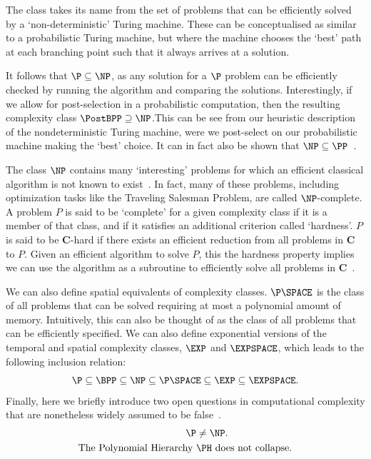 The class takes its name from the set of problems that can be efficiently solved by a `non-deterministic' Turing machine.  These can be conceptualised as similar to a probabilistic Turing machine, but where the machine chooses the `best' path at each branching point such that it always arrives at a solution.\par
It follows that $\P\subseteq \NP$, as any solution for a $\P$ problem can be efficiently checked by running the algorithm and comparing the solutions. Interestingly, if we allow for post-selection in a probabilistic computation, then the resulting complexity class $\PostBPP \supseteq \NP$.This can be see from our heuristic description of the nondeterministic Turing machine, were we post-select on our probabilistic machine making the `best' choice. It can in fact also be shown that $\NP\subseteq \PP$~\cite{Gill1974}.\par
The class $\NP$ contains many `interesting' problems for which an efficient classical algorithm is not known to exist~\cite{Nielsen2000}. In fact, many of these problems, including optimization tasks like the Traveling Salesman Problem, are called $\NP$-complete. A problem $P$ is said to be `complete' for a given complexity class if it is a member of that class, and if it satisfies an additional criterion called `hardness'. $P$ is said to be $\mathbf{C}$-hard if there exists an efficient reduction from all problems in $\mathbf{C}$ to $P$. Given an efficient algorithm to solve $P$, this the hardness property implies we can use the algorithm as a subroutine to efficiently solve all problems in $\mathbf{C}$~\cite{Nielsen2000}.\par
We can also define spatial equivalents of complexity classes. $\P\SPACE$ is the class of all problems that can be solved requiring at most a polynomial amount of memory. Intuitively, this can also be thought of as the class of all problems that can be efficiently specified. We can also define exponential versions of the temporal and spatial complexity classes, $\EXP$ and $\EXPSPACE$, which leads to the following inclusion relation:
\[\P\subseteq\BPP\subseteq \NP \subseteq \P\SPACE \subseteq \EXP \subseteq \EXPSPACE. \]
Finally, here we briefly introduce two open questions in computational complexity that are nonetheless widely assumed to be false~\cite{Nielsen2000}.
\begin{align}
    \P &\neq\NP.\\
    \text{The Polynomial Hierarchy } &\PH \text{ does not collapse.}
\end{align}
